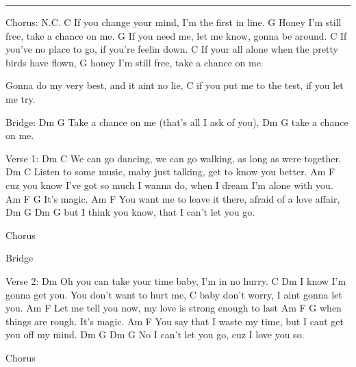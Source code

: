 \noindent\rule{\columnwidth}{1pt}


\begin{lstsong}
Chorus:
N.C.                C
If you change your mind, I'm the first in line.
                                       G
Honey I'm still free, take a chance on me.
G
If you need me, let me know, gonna be around.
                                    C
If you've no place to go, if you're feelin down.
C
If your all alone when the pretty birds have flown,
                                       G
honey I'm still free, take a chance on me.

Gonna do my very best, and it aint no lie,
                                  C
if you put me to the test, if you let me try.

Bridge:
       Dm        G
Take a chance on me (that's all I ask of you),
       Dm        G
take a chance on me.

Verse 1:
Dm                                         C
We can go dancing, we can go walking, as long as were together.
Dm                                       C
Listen to some music, maby just talking, get to know you better.
                      Am                  F
cuz you know I've got so much I wanna do, when I dream I'm alone with you.
Am         F   G
It's magic.
Am                             F
You want me to leave it there, afraid of a love affair,
      Dm           G         Dm             G
but I think you know, that I can't let you go.

Chorus

Bridge

Verse 2:
           Dm
Oh you can take your time baby, I'm in no hurry.
  C                       Dm
I know I'm gonna get you. You don't want to hurt me,
                  C
baby don't worry, I aint gonna let you.
                     Am                       F
Let me tell you now, my love is strong enough to last
                            Am     F G
when things are rough. It's magic.
Am                            F
You say that I waste my time, but I cant get you off my mind.
     Dm           G         Dm       G
No I can't let you go, cuz I love you so.

Chorus
\end{lstsong}
\newpage


